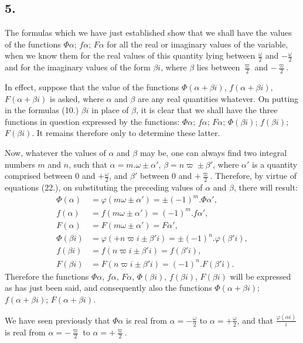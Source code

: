 \documentclass{article}
\begin{document}
\subsection*{5.}

The formulas which we have just established show that we shall have the values of the functions $\Phi\alpha$; $f\alpha$; $F\alpha$ for all the real or imaginary values of the variable, when we know them for the real values of this quantity lying between $\frac{\omega}{2}$ and $-\frac{\omega}{2}$ and for the imaginary values of the form $\beta i$, where $\beta$ lies between $\frac{\varpi}{2}$ and $-\frac{\varpi}{2}$.

In effect, suppose that the value of the functions $\Phi(\alpha+\beta i)$, $f(\alpha+\beta i)$, $F(\alpha+\beta i)$ is asked, where $\alpha$ and $\beta$ are any real quantities whatever. On putting in the formulas (10.) $\beta i$ in place of $\beta$, it is clear that we shall have the three functions in question expressed by the functions: $\Phi\alpha$; $f\alpha$; $F\alpha$; $\Phi(\beta i)$; $f(\beta i)$; $F(\beta i)$. It remains therefore only to determine these latter.

Now, whatever the values of $\alpha$ and $\beta$ may be, one can always find two integral numbers $m$ and $n$, such that $\alpha=m.\omega\pm\alpha'$, $\beta=n\varpi\pm\beta'$, where $\alpha'$ is a quantity comprised between $0$ and $+\frac{\omega}{2}$, and $\beta'$ between $0$ and $+\frac{\varpi}{2}$. Therefore, by virtue of equations (22.), on substituting the preceding values of $\alpha$ and $\beta$, there will result:
\[ \begin{aligned} \Phi(\alpha)&=\varphi(m\omega\pm\alpha')=\pm(-1)^{m}.\Phi\alpha',\\ f(\alpha)&=f(m\omega\pm\alpha')=(-1)^{m}.f\alpha',\\ F(\alpha)&=F(m\omega\pm\alpha')=F\alpha',\\ \Phi(\beta i)&=\varphi(+n\varpi i\pm\beta'i)=\pm(-1)^{n}.\varphi(\beta'i),\\ f(\beta i)&=f(n\varpi i\pm\beta'i)=f(\beta'i),\\ F(\beta i)&=F(n\varpi i\pm\beta'i)=(-1)^{n}.F(\beta'i). \end{aligned} \]
Therefore the functions $\Phi\alpha$, $f\alpha$, $F\alpha$, $\Phi(\beta i)$, $f(\beta i)$, $F(\beta i)$ will be expressed as has just been said, and consequently also the functions $\Phi(\alpha+\beta i)$; $f(\alpha+\beta i)$; $F(\alpha+\beta i)$.

We have seen previously that $\Phi\alpha$ is real from $\alpha=-\frac{\omega}{2}$ to $\alpha=+\frac{\omega}{2}$, and that $\frac{\varphi(\alpha i)}{i}$ is real from $\alpha=-\frac{\varpi}{2}$ to $\alpha=+\frac{\varpi}{2}$.
\end{document}
